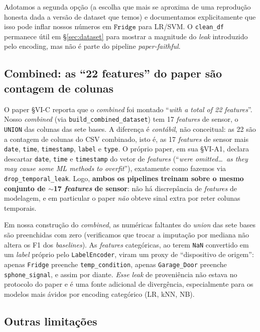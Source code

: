 Adotamos a segunda opção (a escolha que mais se aproxima de uma
reprodução honesta dada a versão de dataset que temos) e
documentamos explicitamente que isso pode inflar nossos números em
$\texttt{Fridge}$ para LR/SVM. O \texttt{clean\_df} permanece útil
em \S{}\ref{sec:dataset} para mostrar a magnitude do \emph{leak}
introduzido pelo encoding, mas não é parte do pipeline
\emph{paper-faithful}.

\subsection{Combined: as ``22 features'' do paper são contagem de colunas}

O paper \S{}VI-C reporta que o \emph{combined} foi montado ``\emph{with
a total of 22 features}''. Nosso \emph{combined} (via
\texttt{build\_combined\_dataset}) tem 17 \emph{features} de sensor,
o \texttt{UNION} das colunas das sete bases. A diferença é
\emph{contábil}, não conceitual: as 22 são a contagem de colunas do CSV
combinado, isto é, as 17 \emph{features} de sensor mais
\texttt{date}, \texttt{time}, \texttt{timestamp}, \texttt{label} e
\texttt{type}. O próprio paper, em sua \S{}VI-A1, declara descartar
\texttt{date}, \texttt{time} e \texttt{timestamp} do vetor de
\emph{features} (``\emph{were omitted\ldots\ as they may cause some ML
methods to overfit}''), exatamente como fazemos via
\texttt{drop\_temporal\_leak}. Logo, \textbf{ambos os pipelines treinam
sobre o mesmo conjunto de $\sim$17 \emph{features} de sensor}: não há
discrepância de \emph{features} de modelagem, e em particular o paper
\emph{não} obteve sinal extra por reter colunas temporais.

Em nossa construção do \emph{combined}, as numéricas faltantes do
\emph{union} das sete bases são preenchidas com zero (verificamos que
trocar a imputação por mediana não altera os F1 dos \emph{baselines}).
As \emph{features} categóricas, ao terem \texttt{NaN} convertido em um
\emph{label} próprio pelo \texttt{LabelEncoder}, viram um proxy de
``dispositivo de origem'': apenas \texttt{Fridge} preenche
\texttt{temp\_condition}, apenas \texttt{Garage\_Door} preenche
\texttt{sphone\_signal}, e assim por diante. \emph{Esse} \emph{leak} de
proveniência não estava no protocolo do paper e é uma fonte adicional
de divergência, especialmente para os modelos mais ávidos por
encoding categórico (LR, kNN, NB).

\subsection{Outras limitações}

